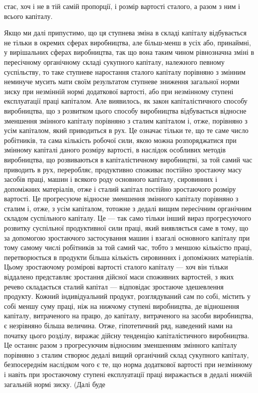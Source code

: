 стає, хоч і не в тій самій пропорції, і розмір вартості сталого,
а разом з ним і всього капіталу.

Якщо ми далі припустимо, що ця ступнева зміна в складі
капіталу відбувається не тільки в окремих сферах виробництва,
але більш-менш в усіх або, принаймні, у вирішальних сферах
виробництва, так що вона таким чином рівнозначна зміні в пересічному
органічному складі сукупного капіталу, належного певному
суспільству, то таке ступневе наростання сталого капіталу
порівняно з змінним неминуче мусить мати своїм результатом
ступневе зниження загальної норми зиску при незмінній нормі
додаткової вартості, або при незмінному ступені експлуатації
праці капіталом. Але виявилось, як закон капіталістичного способу
виробництва, що з розвитком цього способу виробництва
відбувається відносне зменшення змінного капіталу порівняно
з сталим капіталом і, отже, порівняно з усім капіталом, який
приводиться в рух. Це означає тільки те, що те саме число
робітників, та сама кількість робочої сили, якою можна розпоряджатися
при змінному капіталі даного розміру вартості, в наслідок
особливих методів виробництва, що розвиваються в капіталістичному
виробництві, за той самий час приводить в рух,
переробляє, продуктивно споживає постійно зростаючу масу
засобів праці, машин і всякого роду основного капіталу, сировинних
і допоміжних матеріалів, отже і сталий капітал постійно
зростаючого розміру вартості. Це прогресуюче відносне зменшення
змінного капіталу порівняно з сталим і, отже, з усім капіталом,
тотожне з дедалі вищим пересічним органічним складом
суспільного капіталу. Це — так само тільки інший вираз
прогресуючого розвитку суспільної продуктивної сили праці,
який виявляється саме в тому, що за допомогою зростаючого
застосування машин і взагалі основного капіталу при тому самому
числі робітників за той самий час, тобто з меншою кількістю
праці, перетворюється в продукти більша кількість сировинних
і допоміжних матеріалів. Цьому зростаючому розмірові вартості
сталого капіталу — хоч він тільки віддалено представляє зростання
дійсної маси споживних вартостей, з яких речево складається
сталий капітал — відповідає зростаюче здешевлення продукту.
Кожний індивідуальний продукт, розглядуваний сам по
собі, містить у собі меншу суму праці, ніж на нижчому ступені виробництва,
де відношення капіталу, витраченого на працю, до
капіталу, витраченого на засоби виробництва, є незрівняно
більша величина. Отже, гіпотетичний ряд, наведений нами на
початку цього розділу, виражає дійсну тенденцію капіталістичного
виробництва. Це останнє разом з прогресуючим відносним
зменшенням змінного капіталу порівняно з сталим створює дедалі
вищий органічний склад сукупного капіталу, безпосереднім
наслідком чого є те, що норма додаткової вартості при незмінному
і навіть при зростаючому ступені експлуатації праці
виражається в дедалі нижчій загальній нормі зиску. (Далі буде
